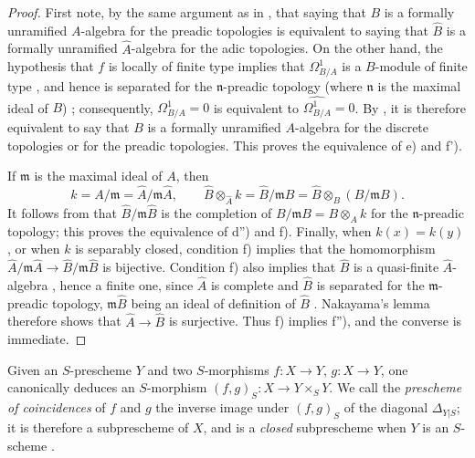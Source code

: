 \begin{proof}
First note, by the same argument as in , that saying that $B$ is a formally unramified $A$-algebra for the preadic topologies is equivalent to saying that $\widehat{B}$ is a formally unramified $\widehat{A}$-algebra for the adic topologies.
On the other hand, the hypothesis that $f$ is locally of finite type implies that $\Omega^1_{B/A}$ is a $B$-module of finite type , and hence is separated for the $\mathfrak{n}$-preadic topology (where $\mathfrak{n}$ is the maximal ideal of $B$) ; consequently, $\Omega^1_{B/A}=0$ is equivalent to $\widehat{\Omega^1_{B/A}}=0$. By , it is therefore equivalent to say that $B$ is a formally unramified $A$-algebra for the discrete topologies or for the preadic topologies. This proves the equivalence of e) and f').

If $\mathfrak{m}$ is the maximal ideal of $A$, then
\[
k=A/\mathfrak{m}=\widehat{A}/\mathfrak{m}\widehat{A},\qquad
\widehat{B}\otimes_{\widehat{A}}k=\widehat{B}/\mathfrak{m}\widehat{B}
=\widehat{B}\otimes_B(B/\mathfrak{m}B).
\]
It follows from  that $\widehat{B}/\mathfrak{m}\widehat{B}$ is the completion of $B/\mathfrak{m}B=B\otimes_A k$ for the $\mathfrak{n}$-preadic topology; this proves the equivalence of d'') and f).
Finally, when $k(x)=k(y)$, or when $k$ is separably closed, condition f) implies that the homomorphism $\widehat{A}/\mathfrak{m}\widehat{A}\to\widehat{B}/\mathfrak{m}\widehat{B}$ is bijective. Condition f) also implies that $\widehat{B}$ is a quasi-finite $\widehat{A}$-algebra , hence a finite one, since $\widehat{A}$ is complete and $\widehat{B}$ is separated for the $\mathfrak{m}$-preadic topology, $\mathfrak{m}\widehat{B}$ being an ideal of definition of $\widehat{B}$ . Nakayama's lemma therefore shows that $\widehat{A}\to\widehat{B}$ is surjective. Thus f) implies f''), and the converse is immediate.
\end{proof}

\begin{env}[17.4.5]
\label{IV.17.4.5}
Given an $S$-prescheme $Y$ and two $S$-morphisms $f:X\to Y$, $g:X\to Y$, one canonically deduces an $S$-morphism $(f,g)_S:X\to Y\times_S Y$.
We call the \emph{prescheme of coincidences} of $f$ and $g$ the inverse image under $(f,g)_S$ of the diagonal $\Delta_{Y|S}$; it is therefore a subprescheme of $X$, and is a \emph{closed} subprescheme when $Y$ is an $S$-scheme .
\end{env}

